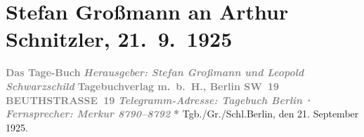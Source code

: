 

         
         \renewcommand{\erwaehntePersonen}{Personen: Stefan Großmann, Leopold Schwarzschild}
         \renewcommand{\erwaehnteInstitutionen}{Institutionen: Das Tage-Buch, Frankfurter Zeitung}
         \renewcommand{\erwaehnteOrte}{Orte: Berlin, Beuthstrasse, Sternwartestraße, Wien, XVIII., Währing, Österreich}
         \renewcommand{\erwaehnteWerke}{}
               \section[Stefan Großmann an Arthur Schnitzler, 21. 9. 1925]{ Stefan Großmann an Arthur Schnitzler, 21. 9. 1925}\nopagebreak{}\rehead{ }\begin{ledgroupsized}[t]{13cm}\normalsize\beginnumbering \toendnotes[C]{\smallbreak\pagebreak[2]} 
\toendnotes[C]{\smallbreak}\pstart
           \noindent{}\centering{}{\pb}\textcolor{gray}{\textbf{Das Tage-Buch}}\pend
           \pstart
           \noindent{}\centering{}\textcolor{gray}{\textbf{\emph{Herausgeber: Stefan Großmann und Leopold Schwarzschild}}}\pend
           \pstart
           \noindent{}\centering{}\textcolor{gray}{\textbf{Tagebuchverlag m. b. H., Berlin SW 19}}\pend
           \pstart
           \noindent{}\centering{}\textcolor{gray}{\textbf{BEUTHSTRASSE 19}}\pend
           \pstart
           \noindent{}\centering{}\textcolor{gray}{\textbf{\emph{Telegramm-Adresse: Tagebuch Berlin ⋅ Fernsprecher: Merkur 8790–8792}}}\pend
           \pstart
           \noindent{}\centering{}\textcolor{gray}{\textbf{\emph{}}}\pend
           \pstart
           \noindent{}\centering{}\textcolor{gray}{\textbf{*}}\pend
           \pstart
           \noindent{}Tgb./Gr./Schl.\hfill Berlin, den 21. September
                     1925.\pend

\end{ledgroupsized}
